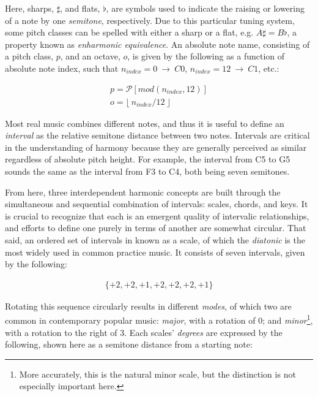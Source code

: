 Here, sharps, $\sharp$, and flats, $\flat$, are symbols used to indicate the raising or lowering of a note by one \emph{semitone}, respectively.
Due to this particular tuning system, some pitch classes can be spelled with either a sharp or a flat, e.g. $A\sharp = B\flat$, a property known as \emph{enharmonic equivalence}.
An absolute note name, consisting of a pitch class, $p$, and an octave, $o$, is given by the following as a function of absolute note index, such that $n_{index}=0~\to~C0$, $n_{index}=12~\to~C1$, etc.:

\begin{align*}
p = \mathcal{P}[mod(n_{index}, 12)] \\
o = \lfloor~n_{index} / 12~\rfloor
\end{align*}

Most real music combines different notes, and thus it is useful to define an \emph{interval} as the relative semitone distance between two notes.
Intervals are critical in the understanding of harmony because they are generally perceived as similar regardless of absolute pitch height.
For example, the interval from C5 to G5 sounds the same as the interval from F3 to C4, both being seven semitones.

From here, three interdependent harmonic concepts are built through the simultaneous and sequential combination of intervals: scales, chords, and keys.
It is crucial to recognize that each is an emergent quality of intervalic relationships, and efforts to define one purely in terms of another are somewhat circular.
That said, an ordered set of intervals in known as a scale, of which the \emph{diatonic} is the most widely used in common practice music.
It consists of seven intervals, given by the following:

\begin{align*}
\{+2, +2, +1, +2, +2, +2, +1\}
\end{align*}

Rotating this sequence circularly results in different \emph{modes}, of which two are common in contemporary popular music: \emph{major}, with a rotation of 0; and \emph{minor}\footnote{More accurately, this is the natural minor scale, but the distinction is not especially important here.}, with a rotation to the right of 3.
Each scales' \emph{degrees} are expressed by the following, shown here as a semitone distance from a starting note:

